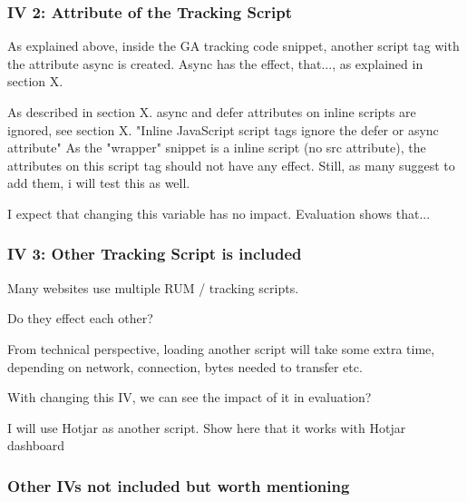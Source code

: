 

\subsubsection{IV 2: Attribute of the Tracking Script}

As explained above, inside the GA tracking code snippet, another script tag with the attribute async is created.
Async has the effect, that..., as explained in section X.

As described in section X. async and defer attributes on inline scripts are ignored, see section X.
"Inline JavaScript script tags ignore the defer or async attribute"
As the "wrapper" snippet is a inline script (no src attribute), the attributes on this script tag should not have any effect.
Still, as many suggest to add them, i will test this as well.

I expect that changing this variable has no impact.
Evaluation shows that...




\subsubsection{IV 3: Other Tracking Script is included}

Many websites use multiple RUM / tracking scripts.

Do they effect each other?

From technical perspective, loading another script will take some extra time, depending on network, connection, bytes needed to transfer etc.

With changing this IV, we can see the impact of it in evaluation?

I will use Hotjar as another script.
Show here that it works with Hotjar dashboard



\subsubsection{Other IVs not included but worth mentioning}



